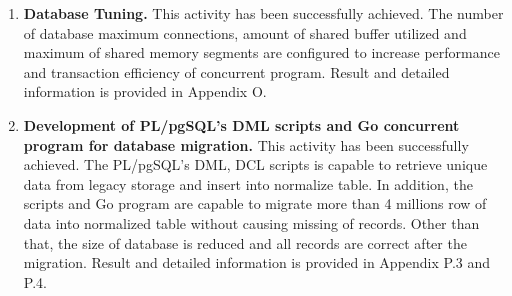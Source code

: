 \begin{enumerate}[topsep=0pt,itemsep=-1ex,partopsep=1ex,parsep=1.5ex]
	\item \textbf{Database Tuning.} This activity has been successfully achieved. The number of database maximum connections, amount of shared buffer utilized and maximum of shared memory segments are configured to increase performance and transaction efficiency of concurrent program. Result and detailed information is provided in Appendix O. 
	
	\item \textbf{Development of PL/pgSQL's DML scripts and Go concurrent program for database migration.} This activity has been successfully achieved. The PL/pgSQL's DML, DCL scripts is capable to retrieve unique data from legacy storage and insert into normalize table. In addition, the scripts and Go program are capable to migrate more than 4 millions row of data into normalized table without causing missing of records. Other than that, the size of database is reduced and all records are correct after the migration. Result and detailed information is provided in Appendix P.3 and P.4. 
	
\end{enumerate}

